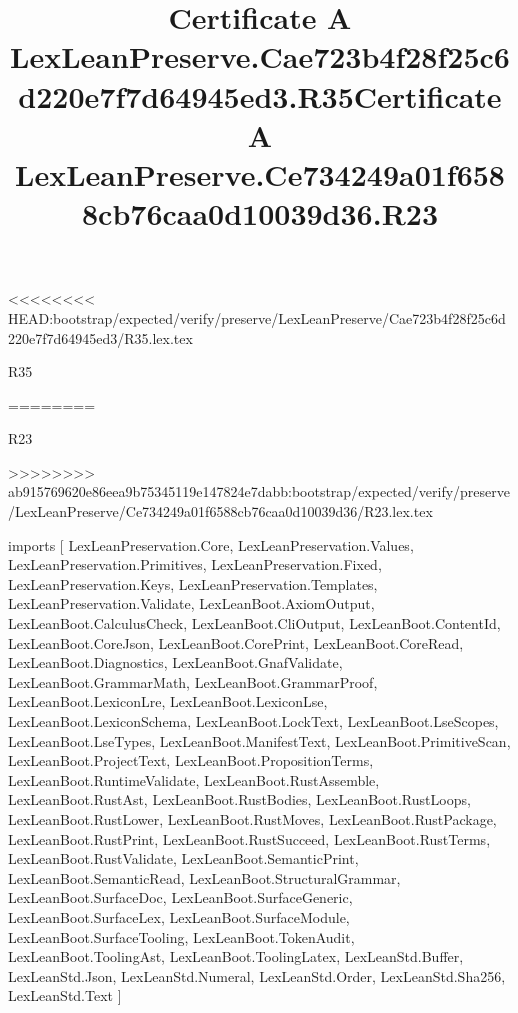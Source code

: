 <<<<<<<< HEAD:bootstrap/expected/verify/preserve/LexLeanPreserve/Cae723b4f28f25c6d220e7f7d64945ed3/R35.lex.tex
\begin{lexlean}{R35}
\title{Certificate A LexLeanPreserve.Cae723b4f28f25c6d220e7f7d64945ed3.R35}
========
\begin{lexlean}{R23}
\title{Certificate A LexLeanPreserve.Ce734249a01f6588cb76caa0d10039d36.R23}
>>>>>>>> ab915769620e86eea9b75345119e147824e7dabb:bootstrap/expected/verify/preserve/LexLeanPreserve/Ce734249a01f6588cb76caa0d10039d36/R23.lex.tex
\begin{coremodule}
imports [
  LexLeanPreservation.Core,
  LexLeanPreservation.Values,
  LexLeanPreservation.Primitives,
  LexLeanPreservation.Fixed,
  LexLeanPreservation.Keys,
  LexLeanPreservation.Templates,
  LexLeanPreservation.Validate,
  LexLeanBoot.AxiomOutput,
  LexLeanBoot.CalculusCheck,
  LexLeanBoot.CliOutput,
  LexLeanBoot.ContentId,
  LexLeanBoot.CoreJson,
  LexLeanBoot.CorePrint,
  LexLeanBoot.CoreRead,
  LexLeanBoot.Diagnostics,
  LexLeanBoot.GnafValidate,
  LexLeanBoot.GrammarMath,
  LexLeanBoot.GrammarProof,
  LexLeanBoot.LexiconLre,
  LexLeanBoot.LexiconLse,
  LexLeanBoot.LexiconSchema,
  LexLeanBoot.LockText,
  LexLeanBoot.LseScopes,
  LexLeanBoot.LseTypes,
  LexLeanBoot.ManifestText,
  LexLeanBoot.PrimitiveScan,
  LexLeanBoot.ProjectText,
  LexLeanBoot.PropositionTerms,
  LexLeanBoot.RuntimeValidate,
  LexLeanBoot.RustAssemble,
  LexLeanBoot.RustAst,
  LexLeanBoot.RustBodies,
  LexLeanBoot.RustLoops,
  LexLeanBoot.RustLower,
  LexLeanBoot.RustMoves,
  LexLeanBoot.RustPackage,
  LexLeanBoot.RustPrint,
  LexLeanBoot.RustSucceed,
  LexLeanBoot.RustTerms,
  LexLeanBoot.RustValidate,
  LexLeanBoot.SemanticPrint,
  LexLeanBoot.SemanticRead,
  LexLeanBoot.StructuralGrammar,
  LexLeanBoot.SurfaceDoc,
  LexLeanBoot.SurfaceGeneric,
  LexLeanBoot.SurfaceLex,
  LexLeanBoot.SurfaceModule,
  LexLeanBoot.SurfaceTooling,
  LexLeanBoot.TokenAudit,
  LexLeanBoot.ToolingAst,
  LexLeanBoot.ToolingLatex,
  LexLeanStd.Buffer,
  LexLeanStd.Json,
  LexLeanStd.Numeral,
  LexLeanStd.Order,
  LexLeanStd.Sha256,
  LexLeanStd.Text
]


\end{coremodule}
\end{lexlean}
\end{lexlean}
